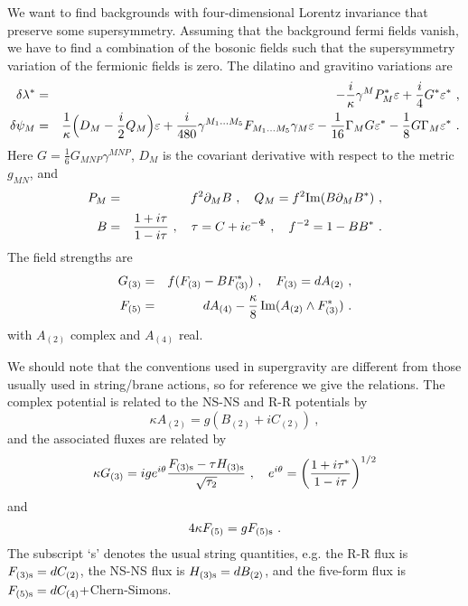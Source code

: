 \documentclass[a4paper,12pt]{article}
\renewcommand{\=}[1]{\bar{#1}}
\begin{document}
We want to find
backgrounds with four-dimensional Lorentz invariance that preserve some
supersymmetry.  Assuming that the background
fermi fields vanish, we have to find a combination of the bosonic fields
such that the supersymmetry variation of the fermionic fields is zero.
The dilatino and gravitino variations are \cite{Schwarz}
\begin{eqnarray}
\delta\lambda^* &=& -\frac{i}{\kappa} \gamma^{M}P_{M}^*\varepsilon +
\frac{i}{4} G^* \varepsilon^*\ ,
\label{dilatino}
\\
\delta\psi_{M} &=& \frac{1}{\kappa} \Bigl(D_{M} -{i\over2} Q_M \Bigr)
\varepsilon + \frac{i}{480}
\gamma^{M_{1}...M_{5}}
F_{M_{1}...M_{5}}\gamma_{M}
\varepsilon - \frac{1}{16} \Gamma_M G \varepsilon^{*} - \frac{1}{8}
G \Gamma_M \varepsilon^{*}\ .
\label{gravitino}
\end{eqnarray}
Here $G = \frac{1}{6} G_{MNP} \gamma^{MNP}$,
$D_M$ is the covariant
derivative with respect to the metric $g_{MN}$, and
\begin{eqnarray}
P_{M} &=& f^2 \partial_M B\ ,
\quad Q_{M}= f^2 {\rm Im}(B \partial_M B^*) \ ,\label{PQ}
\nonumber\\[2pt]
B &=& \frac{1+i\tau}{1-i\tau}
\ ,\quad \tau = C + i e^{-\Phi}\ ,\quad
f^{-2} = 1 - BB^*
\ .
\end{eqnarray}
The field strengths are
\begin{eqnarray}
G_{(3)} &=& f(F_{(3)}-BF_{(3)}^*)\ ,\quad
F_{(3)} = dA_{(2)} \ ,\nonumber\\
F_{(5)}&=& dA_{(4)}- \frac{\kappa}{8}\,{\rm Im}( A_{(2)}\wedge
F_{(3)}^*)\ .
\label{defpotth}
\end{eqnarray}
with $A_{(2)}$ complex and $A_{(4)}$ real.

We should note that the conventions used in supergravity are different from
those
usually used in string/brane actions, so for reference we give the relations.
The complex potential is related to the NS-NS and R-R potentials by
\begin{equation}
\kappa A_{(2)} = g( B_{(2)} + i C_{(2)} )\ ,
\end{equation}
and the associated fluxes are related by
\begin{equation}
\kappa G_{(3)} = i g e^{i\theta} \frac{F_{(3)\rm s} - \tau
H_{(3)\rm s}}{\sqrt{\tau_2}} \ ,\quad e^{i\theta} =
\biggl( \frac{1 + i \tau^*}{1 - i \tau}  \biggr)^{1/2}
\label{G3}
\end{equation}
and
\begin{equation}
4\kappa F_{(5)} = g F_{(5)\rm s}\ .
\end{equation}
The subscript `s' denotes the usual string quantities, e.g. the R-R flux is
$F_{(3)\rm s} = d C_{(2)}$, the NS-NS flux is $H_{(3)\rm s} = d B_{(2)}$,
and the
five-form flux is $F_{(5)\rm s} = dC_{(4)} +$Chern-Simons.
\end{document}
